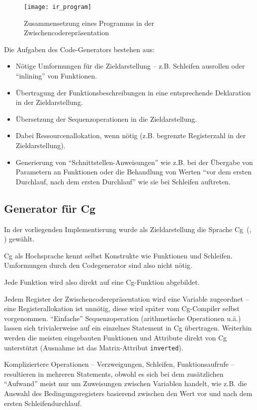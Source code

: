 \documentclass[twoside,a4paper,fleqn,12pt]{book}
\begin{document}
\begin{figure}[h]
   \centering
  \texttt{[image: ir\_program]}
  \caption{Zusammensetzung eines Programms in der Zwischencoderepräsentation}
  \label{fig:ir_program}
\end{figure}

Die Aufgaben des Code-Generators bestehen aus:
\begin{itemize}
\item Nötige Umformungen für die Zieldarstellung -- z.B. Schleifen ausrollen oder ``inlining'' von Funktionen.
\item Übertragung der Funktionsbeschreibungen in eine entsprechende Deklaration in der Zieldarstellung.
\item Übersetzung der Sequenzoperationen in die Zieldarstellung. 
\item Dabei Ressourcenallokation, wenn nötig (z.B. begrenzte Registerzahl in der Zieldarstellung).
\item Generierung von "`Schnittstellen-Anweisungen"' wie z.B. bei der Übergabe von Parametern an Funktionen
oder die Behandlung von Werten "`vor dem ersten Durchlauf, nach dem ersten Durchlauf"' wie sie bei Schleifen
auftreten.
\end{itemize}

\subsection{Generator für Cg}

In der vorliegenden Implementierung wurde als Zieldarstellung die Sprache Cg~(\cite{cgpaper}, \cite{cg_home}) gewählt.

Cg als Hochsprache kennt selbst Konstrukte wie Funktionen und Schleifen. Umformungen durch den Codegenerator
sind also nicht nötig.

Jede Funktion wird also direkt auf eine Cg-Funktion abgebildet.

Jedem Register der Zwischencoderepräsentation wird eine Variable zugeordnet -- eine Re\-gis\-ter\-al\-lo\-ka\-tion ist unnötig, diese wird später vom Cg-Compiler selbst vorgenommen.
"`Einfache"' Sequenzoperation (arithmetische Operationen u.ä.) lassen sich trivialerweise auf ein einzelnes Statement in Cg übertragen. 
Weiterhin werden die meisten eingebauten Funktionen und Attribute direkt von Cg unterstützt (Ausnahme ist das Matrix-Attribut \texttt{inverted}).

Kompliziertere Operationen -- Verzweigungen, Schleifen, Funktionsaufrufe -- resultieren in mehreren Statements, obwohl es sich bei dem
zusätzlichen "`Aufwand"' meist nur um Zuweisungen zwischen Variablen handelt, wie z.B. die Auswahl des Bedingungsregisters basierend zwischen
den Wert vor und nach dem ersten Schleifendurchlauf.
\end{document}

